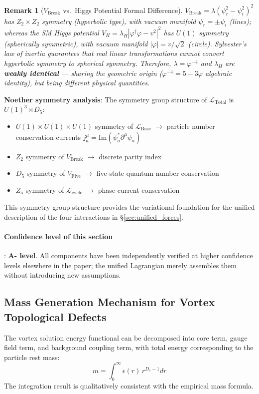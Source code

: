 \documentclass[12pt,a4paper,twocolumn]{article}
\renewcommand{\phi}{\varphi}
\newtheorem{remark}[theorem]{Remark}
\begin{document}
\begin{remark}[$V_{\text{Break}}$ vs.\ Higgs Potential Formal Difference]
$V_{\text{Break}} = \lambda(\psi_r^2 - \psi_i^2)^2$ has $Z_2 \times Z_2$ symmetry (hyperbolic type), with vacuum manifold $\psi_r = \pm\psi_i$ (lines); whereas the SM Higgs potential $V_H = \lambda_H|\phi^\dagger\phi - v^2|^2$ has $U(1)$ symmetry (spherically symmetric), with vacuum manifold $|\phi| = v/\sqrt{2}$ (circle). Sylvester's law of inertia guarantees that real linear transformations cannot convert hyperbolic symmetry to spherical symmetry. Therefore, $\lambda = \phi^{-4}$ and $\lambda_H$ are \textbf{weakly identical} --- sharing the geometric origin ($\phi^{-4} = 5 - 3\phi$ algebraic identity), but being different physical quantities.
\end{remark}

\textbf{Noether symmetry analysis}: The symmetry group structure of $\mathcal{L}_{\text{Total}}$ is $U(1)^3 \rtimes D_5$:
\begin{itemize}
\item $U(1) \times U(1) \times U(1)$ symmetry of $\mathcal{L}_{\text{Base}}$ $\to$ particle number conservation currents $j^\mu_a = \text{Im}(\psi_a^* \partial^\mu \psi_a)$
\item $Z_2$ symmetry of $V_{\text{Break}}$ $\to$ discrete parity index
\item $D_5$ symmetry of $V_{\text{Five}}$ $\to$ five-state quantum number conservation
\item $Z_5$ symmetry of $\mathcal{L}_{\text{cycle}}$ $\to$ phase current conservation
\end{itemize}
This symmetry group structure provides the variational foundation for the unified description of the four interactions in \S\ref{sec:unified_forces}.

\paragraph{Confidence level of this section}: \textbf{A- level}. All components have been independently verified at higher confidence levels elsewhere in the paper; the unified Lagrangian merely assembles them without introducing new assumptions.

\subsection{Mass Generation Mechanism for Vortex Topological Defects}
The vortex solution energy functional can be decomposed into core term, gauge field term, and background coupling term, with total energy corresponding to the particle rest mass:
\[
m = \int_0^\infty \epsilon(r) \, r^{D_s-1} dr
\]
The integration result is qualitatively consistent with the empirical mass formula.
\end{document}
